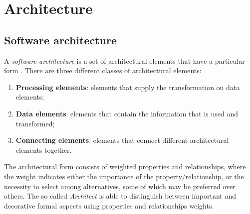 \documentclass[\main/main.tex]{subfiles}
\begin{document}
\chapter{Architecture}

\section{Software architecture}
A \emph{software architecture} is a set of architectural elements that have a particular form \cite{Perry1992FoundationsFT}. There are three different classes of architectural elements: 
\begin{enumerate}
    \item \textbf{Processing elements}: elements that supply the transformation on data elements;
    \item \textbf{Data elements}: elements that contain the information that is used and transformed;
    \item \textbf{Connecting elements}: elements that connect different architectural elements together.
\end{enumerate}
The architectural form consists of weighted properties and relationships, where the weight indicates either the importance of the property/relationship, or the necessity to select among alternatives, some of which may be preferred over others. The so called \emph{Architect} is able to distinguish between important and decorative formal aspects using properties and relationships weights.
\end{document}
